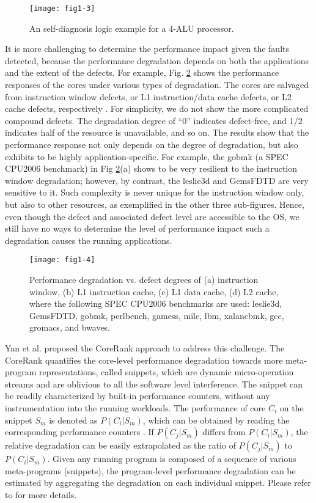\begin{figure}[t]
\centering
\texttt{[image: fig1-3]}
\caption{An self-diagnosis logic example for a 4-ALU processor.}
\label{fig:self-diagnosis-example} 
\end{figure}

It is more challenging to determine the performance impact given the faults detected, because the performance degradation depends on both the applications and the extent of the defects. For example, Fig. \ref{fig:performance-degradation} shows the performance responses of the cores under various types of degradation. The cores are salvaged from instruction window defects, or L1 instruction/data cache defects, or L2 cache defects, respectively \cite{powell2009architectural}. For simplicity, we do not show the more complicated compound defects. The degradation degree of “0” indicates defect-free, and 1/2 indicates half of the resource is unavailable, and so on. The results show that the performance response not only depends on the degree of degradation, but also exhibits to be highly application-specific. For example, the gobmk (a SPEC CPU2006 benchmark) in Fig \ref{fig:performance-degradation}(a) shows to be very resilient to the instruction window degradation; however, by contrast, the leslie3d and GemsFDTD are very sensitive to it. Such complexity is never unique for the instruction window only, but also to other resources, as exemplified in the other three sub-figures. Hence, even though the defect and associated defect level are accessible to the OS, we still have no ways to determine the level of performance impact such a degradation causes the running applications.

\begin{figure}[t]
\centering
\texttt{[image: fig1-4]}
\caption{Performance degradation vs. defect degrees of (a) instruction window, (b) L1 instruction cache, (c) L1 data cache, (d) L2 cache, where the following SPEC CPU2006 benchmarks are used: leslie3d, GemsFDTD, gobmk, perlbench, gamess, milc, lbm, xalancbmk, gcc, gromacs, and bwaves.}
\label{fig:performance-degradation} 
\end{figure}


Yan et al. \cite{yan2015corerank} proposed the CoreRank approach to address this challenge. The CoreRank quantifies the core-level performance degradation towards more meta-program representations, called snippets, which are dynamic micro-operation streams and are oblivious to all the software level interference. The snippet can be readily characterized by built-in performance counters, without any instrumentation into the running workloads. The performance of core $C_i$ on the snippet $S_m$ is denoted as $P(C_{i}|S_{m})$, which can be obtained by reading the corresponding performance counters \cite{eyerman2007top}. If $P(C_{j}|S_{m})$ differs from $P(C_{i}|S_{m})$, the relative degradation can be easily extrapolated as the ratio of $P(C_{j}|S_{m})$ to $P(C_{i}|S_{m})$. Given any running program is composed of a sequence of various meta-programs (snippets), the program-level performance degradation can be estimated by aggregating the degradation on each individual snippet. Please refer to \cite{yan2015corerank} for more details.

